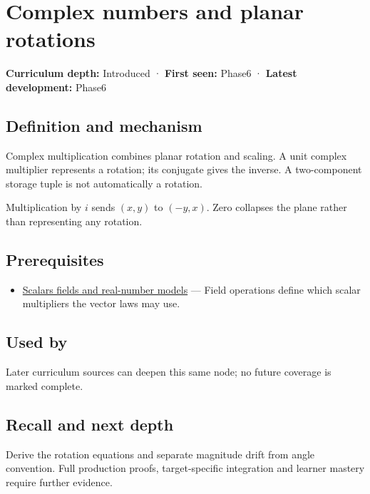 \hypertarget{appendix-f77eadcc4a93}{}\label{referencestart:appendix-f77eadcc4a93}
\section{Complex numbers and planar rotations}\label{appendix-f77eadcc4a93-complex-numbers-and-planar-rotations}

\textbf{Curriculum depth:} Introduced · \textbf{First seen:} Phase6 · \textbf{Latest development:} Phase6

\subsection{Definition and mechanism}\label{appendix-f77eadcc4a93-definition-and-mechanism}

Complex multiplication combines planar rotation and scaling. A unit complex multiplier represents a rotation; its conjugate gives the inverse. A two-component storage tuple is not automatically a rotation.

Multiplication by \(i\) sends \((x,y)\) to \((-y,x)\). Zero collapses the plane rather than representing any rotation.

\subsection{Prerequisites}\label{appendix-f77eadcc4a93-prerequisites}

\begin{itemize}
\tightlist
\item
  \hyperref[appendix-52051ad550fe]{Scalars fields and real-number models} --- Field operations define which scalar multipliers the vector laws may use.
\end{itemize}

\subsection{Used by}\label{appendix-f77eadcc4a93-used-by}

Later curriculum sources can deepen this same node; no future coverage is marked complete.

\subsection{Recall and next depth}\label{appendix-f77eadcc4a93-recall-and-next-depth}

Derive the rotation equations and separate magnitude drift from angle convention. Full production proofs, target-specific integration and learner mastery require further evidence.

